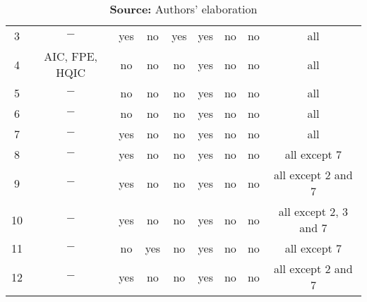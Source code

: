 \begin{table}[]
{\begin{tabular}{c|c|c|c|c|c|c|c|c}
3  & $-$            & yes & no                 & yes            & yes & no                 & no             & all                   \\
4  & AIC, FPE, HQIC & no  & no                 & no             & yes & no                 & no             & all                   \\
5  & $-$            & no  & no                 & no             & yes & no                 & no             & all                   \\
6  & $-$            & no  & no                 & no             & yes & no                 & no             & all                   \\
7  & $-$            & yes & no                 & no             & yes & no                 & no             & all                   \\
8  & $-$            & yes & no                 & no             & yes & no                 & no             & all except 7          \\
9  & $-$            & yes & no                 & no             & yes & no                 & no             & all except 2 and 7    \\
10 & $-$            & yes & no                 & no             & yes & no                 & no             & all except 2, 3 and 7 \\
11 & $-$            & no  & yes                & no             & yes & no                 & no             & all except 7          \\
12 & $-$            & yes & no                 & no             & yes & no                 & no             & all except 2 and 7    \\ \hline\hline
\end{tabular}%
}
\caption*{\textbf{Source:} Authors' elaboration}
\end{table}
